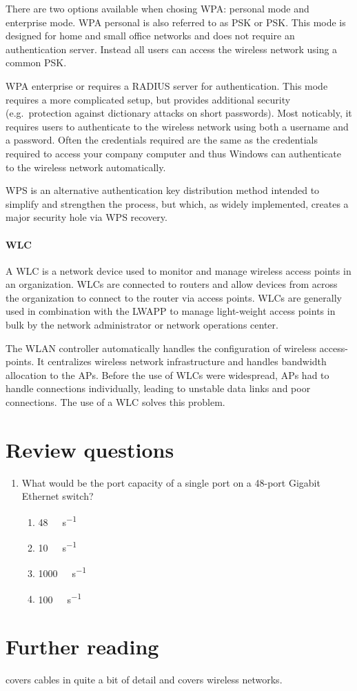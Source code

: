 There are two options available when chosing \ac{WPA}: personal mode and enterprise mode.
\ac{WPA} personal is also referred to as \acs{PSK} or \acl{PSK}.
This mode is designed for home and small office networks and does not require an authentication server.
Instead all users can access the wireless network using a common \acl{PSK}.

\ac{WPA} enterprise or  requires a \ac{RADIUS} server for authentication.
This mode requires a more complicated setup, but provides additional security (e.g.\ protection against dictionary attacks on short passwords).
Most noticably, it requires users to authenticate to the wireless network using both a username and a password.
Often the credentials required are the same as the credentials required to access your company computer and thus Windows can authenticate to the wireless network automatically.

\ac{WPS} is an alternative authentication key distribution method intended to simplify and strengthen the process, but which, as widely implemented, creates a major security hole via \ac{WPS}  recovery.

\paragraph{\acl{WLC}}
A \acf{WLC} is a network device used to monitor and manage wireless access points in an organization.
\acsp{WLC} are connected to routers and allow devices from across the organization to connect to the router via access points.
\aclp{WLC} are generally used in combination with the \ac{LWAPP} to manage light-weight access points in bulk by the network administrator or network operations center.

The \acs{WLAN} controller automatically handles the configuration of wireless access-points.
It centralizes wireless network infrastructure and handles bandwidth allocation to the \aclp{AP}.
Before the use of \acsp{WLC} were widespread, \aclp{AP} had to handle connections individually, leading to unstable data links and poor connections.
The use of a \acs{WLC} solves this problem.


\section{Review questions}
\begin{enumerate}
\item What would be the port capacity of a single port on a 48-port Gigabit Ethernet switch?
   \begin{enumerate}
      \item \SI{48}{\giga\bit\per\second}
      \item \SI{10}{\mega\bit\per\second}
      \item \SI{1000}{\mega\bit\per\second}
      \item \SI{100}{\mega\bit\per\second}
   \end{enumerate}
\end{enumerate}

\section{Further reading}
\textcite{oliviero} covers cables in quite a bit of detail and \textcite{coleman} covers wireless networks.
